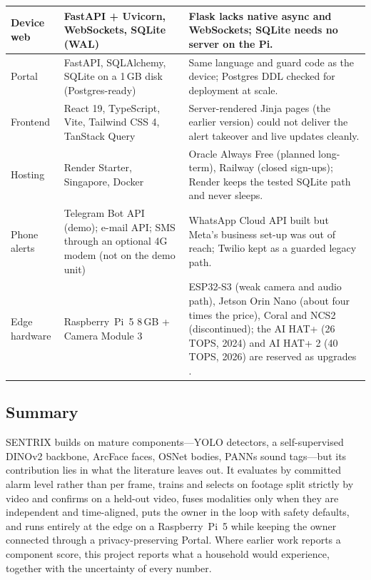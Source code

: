 \begin{longtable}{|L{2.6cm}|L{3.3cm}|L{7.45cm}|}
Device web & FastAPI + Uvicorn, WebSockets, SQLite (WAL) & Flask lacks native async and WebSockets; SQLite needs no server on the Pi.\\ \hline
Portal & FastAPI, SQLAlchemy, SQLite on a 1\,GB disk (Postgres-ready) & Same language and guard code as the device; Postgres DDL checked for deployment at scale.\\ \hline
Frontend & React 19, TypeScript, Vite, Tailwind CSS 4, TanStack Query & Server-rendered Jinja pages (the earlier version) could not deliver the alert takeover and live updates cleanly.\\ \hline
Hosting & Render Starter, Singapore, Docker & Oracle Always Free (planned long-term), Railway (closed sign-ups); Render keeps the tested SQLite path and never sleeps.\\ \hline
Phone alerts & Telegram Bot API (demo); e-mail API; SMS through an optional 4G modem (not on the demo unit) & WhatsApp Cloud API built but Meta's business set-up was out of reach; Twilio kept as a guarded legacy path.\\ \hline
Edge hardware & Raspberry~Pi~5 8\,GB + Camera Module 3 & ESP32-S3 (weak camera and audio path), Jetson Orin Nano (about four times the price), Coral and NCS2 (discontinued); the AI HAT+ (26 TOPS, 2024) and AI HAT+ 2 (40 TOPS, 2026) are reserved as upgrades \cite{rpi2024aihat, rpi2026aihat2}.\\ \hline
\end{longtable}
\endgroup

\subsection{Summary}
\label{sec:lit-summary}
SENTRIX builds on mature components---YOLO detectors, a self-supervised DINOv2 backbone, ArcFace faces, OSNet bodies, PANNs sound tags---but its contribution lies in what the literature leaves out. It evaluates by committed alarm level rather than per frame, trains and selects on footage split strictly by video and confirms on a held-out video, fuses modalities only when they are independent and time-aligned, puts the owner in the loop with safety defaults, and runs entirely at the edge on a Raspberry~Pi~5 while keeping the owner connected through a privacy-preserving Portal. Where earlier work reports a component score, this project reports what a household would experience, together with the uncertainty of every number.

